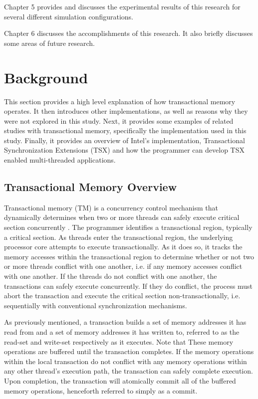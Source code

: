 \documentclass[a4paper]{article}
\begin{document}
\indent
Chapter 5 provides and discusses the experimental results of this research for
several different simulation configurations.
\par

\indent
Chapter 6 discusses the accomplishments of this research.  It also briefly
discusses some areas of future research.
\par

\newpage

\section{\textbf{Background}}

\indent 
This section provides a high level explanation of how transactional
memory operates.  It then introduces other implementations, as well as reasons
why they were not explored in this study.  Next, it provides some examples of
related studies with transactional memory, specifically the implementation used
in this study. Finally, it provides an overview of Intel's implementation,
Transactional Synchronization Extensions (TSX) and how the programmer can
develop TSX enabled multi-threaded applications.
\par

\subsection{\textbf{Transactional Memory Overview}}

\indent
Transactional memory (TM) is a concurrency control mechanism that dynamically
determines when two or more threads can safely execute critical section
concurrently \cite{sle_rajwar}.  The programmer identifies a transactional
region, typically a critical section.  As threads enter the transactional region,
the underlying processor core attempts to execute transactionally. As it does
so, it tracks the memory accesses within the transactional region to determine
whether or not two or more threads conflict with one another, i.e. if any memory
accesses conflict with one another.  If the threads do not conflict with one
another, the transactions can safely execute concurrently.  If they do conflict,
the process must abort the transaction and execute the critical section
non-transactionally, i.e.  sequentially with conventional synchronization
mechanisms. 
\par

\indent 
As previously mentioned, a transaction builds a set of memory addresses it has
read from and a set of memory addresses it has written to, referred to as the
read-set and write-set respectively \cite{intel_prog_ref} as it executes.  Note
that These memory operations are buffered until the transaction completes.  If
the  memory operations within the local transaction do not conflict with any
memory operations within any other thread's execution path, the transaction can
safely complete execution.  Upon completion, the transaction will atomically
commit all of the buffered memory operations, henceforth referred to simply as a
commit.
\par
\end{document}
